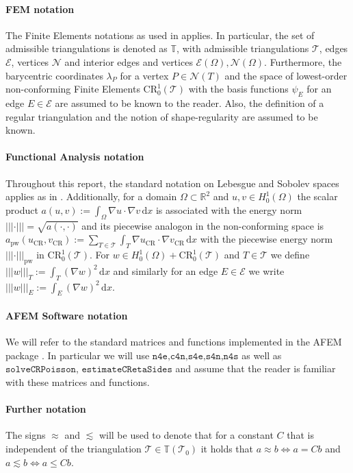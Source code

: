 \documentclass[11pt,a4paper]{article}
\newcommand{\vCR}{v_{\mathrm{CR}}}
\newcommand{\uCR}{u_{\mathrm{CR}}}
\newcommand{\dx}{\,\mathrm{d}x}
\newcommand{\enorm}[1]{\left\lvert\!\left\lvert\!\left\lvert #1 \right\rvert\!\right\rvert\!\right\rvert}
\newcommand{\CR}{\mathrm{CR}^1_0(\mathcal{T})}
\begin{document}
\paragraph{FEM notation} The Finite Elements notations as used in \cite{CPDEscript} applies. In particular, the set of admissible triangulations is denoted as \(\mathbb{T}\), with admissible triangulations \(\mathcal{T}\), edges \(\mathcal{E}\), vertices \(\mathcal{N}\) and interior edges and vertices \(\mathcal{E}(\Omega), \mathcal{N}(\Omega)\). Furthermore, the barycentric coordinates \(\lambda_P\) for a vertex \(P \in \mathcal{N}(T)\) and the space of lowest-order non-conforming Finite Elements \(\CR\) with the basis functions \(\psi_E\) for an edge \(E \in \mathcal{E}\) are assumed to be known to the reader. Also, the definition of a regular triangulation and the notion of shape-regularity are assumed to be known.
\paragraph{Functional Analysis notation}
Throughout this report, the standard notation on Lebesgue and Sobolev spaces applies as in \cite{Evans2000}. Additionally, for a domain \(\Omega \subset \mathbb{R}^2\) and \(u,v \in H^1_0(\Omega)\) the scalar product \(a(u,v) := \int_\Omega \nabla u \cdot \nabla v \dx \) is associated with the energy norm \(\enorm{\cdot} = \sqrt{a(\cdot,\cdot)}\) and its piecewise analogon in the non-conforming space is \(a_\mathrm{pw}(\uCR,\vCR) := \sum_{T \in \mathcal{T}} \int_T \nabla \uCR \cdot \nabla \vCR \dx \) with the piecewise energy norm \(\enorm{\cdot}_\mathrm{pw}\) in \(\CR\). For \(w \in H^1_0(\Omega) + \CR\) and \(T \in \mathcal{T}\) we define \(\enorm{w}_T := \int_T (\nabla w)^2 \dx \) and similarly for an edge \(E \in \mathcal{E}\) we write \(\enorm{w}_E := \int_E (\nabla w)^2 \dx\). 
\paragraph{AFEM Software notation} We will refer to the standard matrices and functions implemented in the AFEM package \cite{AFEMinterfaceDocu}. In particular we will use \(\texttt{n4e,c4n,s4e,s4n,n4s}\) as well as \(\texttt{solveCRPoisson, estimateCRetaSides}\) and assume that the reader is familiar with these matrices and functions.
\paragraph{Further notation} The signs \(\approx\) and  \(\lesssim\) will be used to denote that for a constant \(C\) that is independent of the triangulation \(\mathcal{T} \in \mathbb{T}(\mathcal{T}_0)\) it holds that \(a \approx b \iff a = Cb\) and \(a \lesssim b \iff a \le C b\). 
\end{document}

